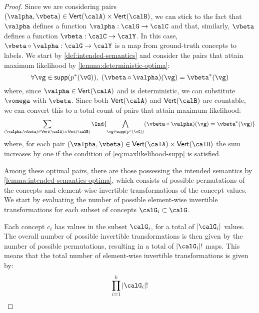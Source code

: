 \begin{proof}
    Since we are considering pairs $(\valpha, \vbeta) \in \Vset{\calA} \times \Vset{\calB}$, we can stick to the fact that $\valpha$ defines a function $\valpha:\calG \to \calC$ and that, similarly, $\vbeta$ defines a function $\vbeta: \calC \to \calY$. In this case, $\vbeta \circ \valpha: \calG \to \calY$ is a map from ground-truth concepts to labels.
    We start by \cref{def:intended-semantics} and consider the pairs that attain maximum likelihood by \cref{lemma:deterministic-optima}: 
    \[
        \forall \vg \in \mathsf{supp}(p^*(\vG)), \; (\vbeta \circ \valpha) (\vg) = \vbeta^* ( \vg)
        \label{eq:maxlikelihood-supp}
    \]
    where, since $\valpha \in \Vset{\calA}$ and is deterministic, we can substitute $\vomega$ with $\vbeta$. Since both $\Vset{\calA}$ and $\Vset{\calB}$ are countable, we can convert this to a total count of pairs that attain maximum likelihood:
    \[
        \sum_{(\valpha, \vbeta) \in \Vset{\calA} \times \Vset{\calB}} 
        \Ind{
            \bigwedge_{\vg \in \mathsf{supp} (p^*(\vG)) } (\vbeta \circ \valpha) ( \vg) = \vbeta^* (\vg)
        } \label{eq:count-jrss-app}
    \]
    where, for each pair $(\valpha, \vbeta) \in \Vset{\calA} \times \Vset{\calB}$ the sum increases by one if the condition of \cref{eq:maxlikelihood-supp} is satisfied.
    
    Among these optimal pairs, there are those possessing the intended semantics by \cref{lemma:intended-semantics-optima}, which consists of possible permutations of the concepts and element-wise invertible transformations of the concept values. We start by evaluating the number of possible element-wise invertible transformations for each subset of concepts $\calG_i \subset \calG$. 

    Each concept $c_i$ has values in the subset $\calG_i$, for a  total of $|\calG_i|$ values. The overall number of possible invertible transformations is then given by the number of possible permutations, resulting in a total of $|\calG_i|!$ maps. 
    This means that the total number of element-wise invertible transformations is given by:
    \[
        \prod_{i=1}^k |\calG_i|!
    \]


\end{proof}
